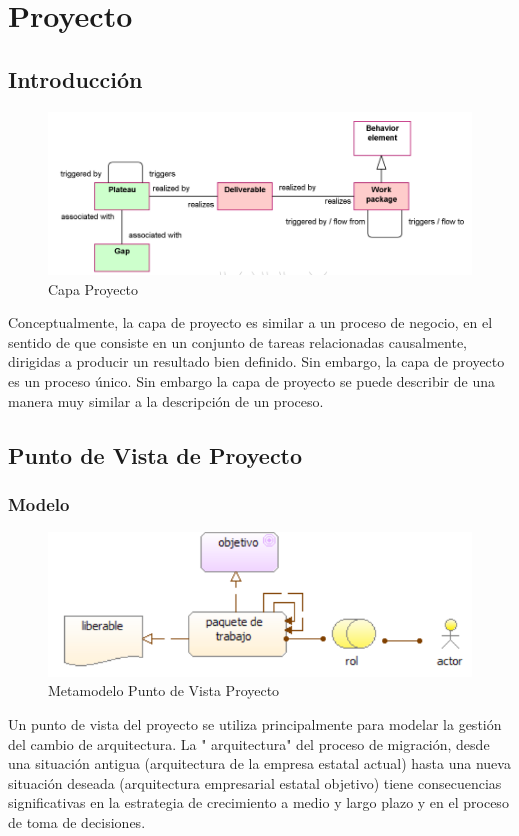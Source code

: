 \chapter{Proyecto}

\section{Introducción}

\begin{figure}[th!]
	\centering
	\includegraphics[width=1\linewidth]{arquitectura/imagenes/capaProyecto}
	\caption{Capa Proyecto}
	\label{modelo capa proyecto}
\end{figure}
Conceptualmente, la capa de proyecto es similar a un proceso de negocio, en el sentido de que consiste en un conjunto de tareas relacionadas causalmente, dirigidas a producir un resultado bien definido. Sin embargo, la capa de proyecto es un proceso único. Sin embargo la capa de proyecto se puede describir de una manera muy similar a la descripción de un proceso.

\newpage

\section{Punto de Vista de Proyecto}

\subsection{Modelo}
\begin{figure}[th!]
	\centering
	\includegraphics[width=0.7\linewidth]{arquitectura/imagenes/modeloProyecto}
	\caption{Metamodelo Punto de Vista Proyecto}
	\label{metamodelo proyecto}
\end{figure}
Un punto de vista del proyecto se utiliza principalmente para modelar la gestión del cambio de arquitectura. La "   arquitectura" del proceso de migración, desde una situación antigua (arquitectura de la empresa estatal actual) hasta una nueva situación deseada (arquitectura empresarial estatal objetivo) tiene consecuencias significativas en la estrategia de crecimiento a medio y largo plazo y en el proceso de toma de decisiones.


